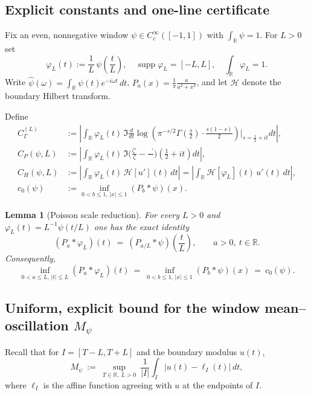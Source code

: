 \documentclass[11pt]{article}
\newtheorem{lemma}[theorem]{Lemma}
\theoremstyle{definition}
\theoremstyle{remark}
\newcommand{\R}{\mathbb{R}}
\newcommand{\Poisson}{P}
\DeclareMathOperator{\dettwo}{det_2}
\begin{document}
\subsection{Explicit constants and one-line certificate}\label{sec:certificate}
Fix an even, nonnegative window $\psi\in C_c^\infty([-1,1])$ with $\int_\R\psi=1$. For $L>0$ set
\[ \varphi_L(t):=\frac{1}{L}\,\psi\!\left(\frac{t}{L}\right),\quad \operatorname{supp}\varphi_L=[-L,L],\quad \int_\R \varphi_L=1. \]
Write $\widehat\psi(\omega)=\int_\R \psi(t)e^{-i\omega t}\,dt$, $\Poisson_a(x)=\tfrac{1}{\pi}\tfrac{a}{a^2+x^2}$, and let $\mathcal H$ denote the boundary Hilbert transform.

Define
\begin{align*}
 C_\Gamma^{(L)} &:= \left|\int_\R \varphi_L(t)\,\Im\frac{d}{dt}\log\!\left(\pi^{-s/2}\Gamma\!\left(\frac{s}{2}\right)\cdot\frac{s(1-s)}{2}\right)\!\Big|_{s=\frac12+it} dt\right|,\\
 C_P(\psi,L) &:= \left|\int_\R \varphi_L(t)\,\Im\Big(\frac{\zeta'}{\zeta}-\frac{\dettwo'}{\dettwo}\Big)\!\left(\tfrac12+it\right) dt\right|,\\
 C_H(\psi,L) &:= \left|\int_\R \varphi_L(t)\,\mathcal H[u'](t)\,dt\right|=\left|\int_\R \mathcal H[\varphi_L](t)\,u'(t)\,dt\right|,\\
 c_0(\psi) &:= \inf_{0<b\le 1,\,|x|\le 1} (\Poisson_b*\psi)(x).
\end{align*}
\begin{lemma}[Poisson scale reduction]\label{lem:poisson-scale}
For every $L>0$ and $\varphi_L(t)=L^{-1}\psi(t/L)$ one has the exact identity
\[
  (\Poisson_a*\varphi_L)(t)\ =\ (\Poisson_{a/L}*\psi)\!\left(\frac{t}{L}\right),\qquad a>0,\ t\in\R.
\]
Consequently,
\[
  \inf_{0<a\le L,\,|t|\le L}(\Poisson_a*\varphi_L)(t)\ =\ \inf_{0<b\le 1,\,|x|\le 1}(\Poisson_b*\psi)(x)\ =\ c_0(\psi).
\]
\end{lemma}

\subsection*{Uniform, explicit bound for the window mean–oscillation $M_\psi$}

Recall that for $I=[T{-}L,T{+}L]$ and the boundary modulus $u(t)$,
\[
  M_\psi\ :=\ \sup_{T\in\R,\ L>0}\ \frac{1}{|I|}\int_I\big|u(t)-\ell_I(t)\big|\,dt,
\]
where $\ell_I$ is the affine function agreeing with $u$ at the endpoints of $I$.
\end{document}
